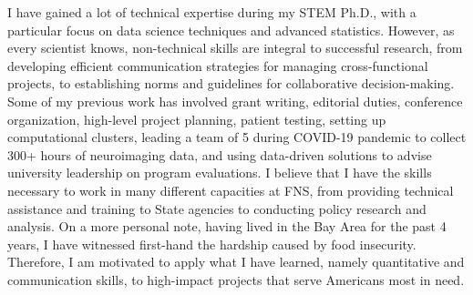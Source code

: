 \documentclass[9pt, a4paper]{maedbh-cv}
\begin{document}
\begin{cvletter}
I have gained a lot of technical expertise during my STEM Ph.D., with a particular focus on data science techniques and advanced statistics. However, as every scientist knows, non-technical skills are integral to successful research, from developing efficient communication strategies for managing cross-functional projects, to establishing norms and guidelines for collaborative decision-making. Some of my previous work has involved grant writing, editorial duties, conference organization, high-level project planning, patient testing, setting up computational clusters, leading a team of 5 during COVID-19 pandemic to collect 300+ hours of neuroimaging data, and using data-driven solutions to advise university leadership on program evaluations. I believe that I have the skills necessary to work in many different capacities at FNS, from providing technical assistance and training to State agencies to conducting policy research and analysis. On a more personal note, having lived in the Bay Area for the past 4 years, I have witnessed first-hand the hardship caused by food insecurity. Therefore, I am motivated to apply what I have learned, namely quantitative and communication skills, to high-impact projects that serve Americans most in need.

\end{cvletter}

\makeletterclosing
\end{document}
